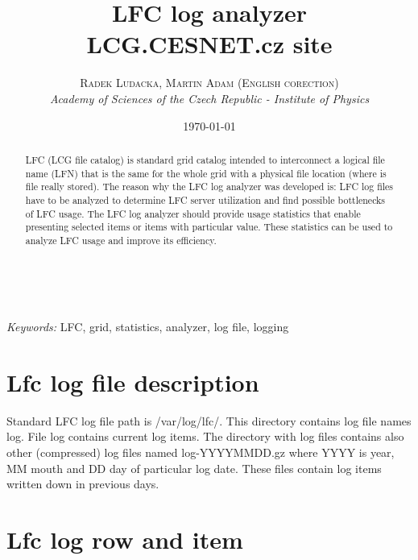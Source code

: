 \documentclass[a4paper, 11pt]{article} %
\title{\textbf{LFC log analyzer}\\ %
LCG.CESNET.cz site} %
\author{\textsc{Radek Ludacka, Martin Adam (English corection)} %
\\{\textit{Academy of Sciences of the Czech Republic - Institute of Physics}}} %
\date{\today} %
\makeatletter
\renewcommand{\maketitle}{ %
\begin{flushright} %
{\LARGE\@title} %

\vspace{50pt} %

{\large\@author} %
\\\@date %

\vspace{40pt} %
\end{flushright}
}
\makeatother
\begin{document}
\maketitle %



\begin{abstract}
LFC (LCG file catalog) is standard grid catalog intended to interconnect a logical file name (LFN) that is the same for the whole grid with a physical file location (where is file really stored). The reason why the LFC log analyzer was developed is: LFC log files have to be analyzed to determine LFC server utilization and find possible bottlenecks of LFC usage. The LFC log analyzer should provide usage statistics that enable presenting selected items or items with particular value. These statistics can be used to analyze LFC usage and improve its efficiency.
\end{abstract}

\hspace*{3,6mm}\textit{Keywords:} LFC, grid, statistics, analyzer, log file, logging %

\vspace{30pt} %


\section*{Lfc log file description}

Standard LFC log file path is /var/log/lfc/. This directory contains log file names log. File log contains current log items. The directory with log files contains also other (compressed) log files named log-YYYYMMDD.gz where YYYY is year, MM mouth and DD day of particular log date. These files contain log items written down in previous days.

\newpage

\section{Lfc log row and item}
\end{document}
